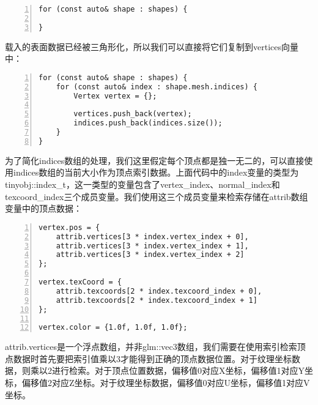 \documentclass{ctexart}
\begin{document}
\begin{lstlisting}[language={[ANSI]C},keywordstyle=\color{blue!70},commentstyle=\color{red!50!green!50!blue!50},frame=shadowbox, rulesepcolor=\color{red!20!green!20!blue!20},basicstyle=\small,numbers=left, numberstyle=\tiny,breaklines=true]
for (const auto& shape : shapes) {

}
\end{lstlisting}

载入的表面数据已经被三角形化，所以我们可以直接将它们复制到vertices向量中：

\begin{lstlisting}[language={[ANSI]C},keywordstyle=\color{blue!70},commentstyle=\color{red!50!green!50!blue!50},frame=shadowbox, rulesepcolor=\color{red!20!green!20!blue!20},basicstyle=\small,numbers=left, numberstyle=\tiny,breaklines=true]
for (const auto& shape : shapes) {
	for (const auto& index : shape.mesh.indices) {
		Vertex vertex = {};

		vertices.push_back(vertex);
		indices.push_back(indices.size());
	}
}
\end{lstlisting}

为了简化indices数组的处理，我们这里假定每个顶点都是独一无二的，可以直接使用indices数组的当前大小作为顶点索引数据。上面代码中的index变量的类型为tinyobj::index\_t，这一类型的变量包含了vertex\_index、normal\_index和texcoord\_index三个成员变量。我们使用这三个成员变量来检索存储在attrib数组变量中的顶点数据：

\begin{lstlisting}[language={[ANSI]C},keywordstyle=\color{blue!70},commentstyle=\color{red!50!green!50!blue!50},frame=shadowbox, rulesepcolor=\color{red!20!green!20!blue!20},basicstyle=\small,numbers=left, numberstyle=\tiny,breaklines=true]
vertex.pos = {
	attrib.vertices[3 * index.vertex_index + 0],
	attrib.vertices[3 * index.vertex_index + 1],
	attrib.vertices[3 * index.vertex_index + 2]
};

vertex.texCoord = {
	attrib.texcoords[2 * index.texcoord_index + 0],
	attrib.texcoords[2 * index.texcoord_index + 1]
};

vertex.color = {1.0f, 1.0f, 1.0f};
\end{lstlisting}

attrib.vertices是一个浮点数组，并非glm::vec3数组，我们需要在使用索引检索顶点数据时首先要把索引值乘以3才能得到正确的顶点数据位置。对于纹理坐标数据，则乘以2进行检索。对于顶点位置数据，偏移值0对应X坐标，偏移值1对应Y坐标，偏移值2对应Z坐标。对于纹理坐标数据，偏移值0对应U坐标，偏移值1对应V坐标。
\end{document}
